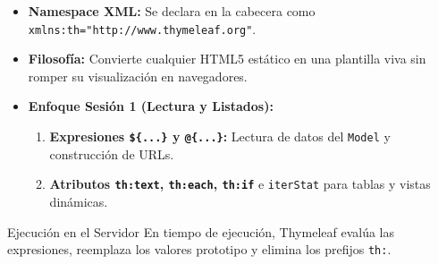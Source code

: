 \documentclass[aspectratio=169]{beamer}
\begin{document}

  {
    \begin{itemize}
      \item \textbf{Namespace XML:} Se declara en la cabecera como \texttt{xmlns:th="http://www.thymeleaf.org"}.
      \item \textbf{Filosof\'ia:} Convierte cualquier HTML5 est\'atico en una plantilla viva sin romper su visualizaci\'on en navegadores.
      \item \textbf{Enfoque Sesi\'on 1 (Lectura y Listados):}
        \begin{enumerate}
          \item \textbf{Expresiones \texttt{\$\{...\}} y \texttt{@\{...\}}:} Lectura de datos del \texttt{Model} y construcci\'on de URLs.
          \item \textbf{Atributos \texttt{th:text}, \texttt{th:each}, \texttt{th:if}} e \texttt{iterStat} para tablas y vistas din\'amicas.
        \end{enumerate}
    \end{itemize}
  }
  {Ejecuci\'on en el Servidor}
  {En tiempo de ejecuci\'on, Thymeleaf eval\'ua las expresiones, reemplaza los valores prototipo y elimina los prefijos \texttt{th:}.}
\end{document}
